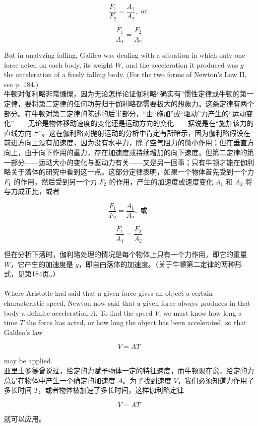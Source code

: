 \documentclass{article}
\begin{document}
\[
\frac{F_1}{F_2} = \frac{A_1}{A_2}, \text{ or }
\]

\[
\frac{F_1}{A_1} = \frac{F_2}{A_2}
\]

\noindent But in analyzing falling, Galileo was dealing with a situation in which only one force acted on each body, its weight \( W \), and the acceleration it produced was \( g \) the acceleration of a freely falling body. (For the two forms of Newton's Law II, see p. 184.)\\
牛顿对伽利略非常慷慨，因为无论怎样论证伽利略“确实有”惯性定律或牛顿的第一定律，要将第二定律的任何功劳归于伽利略都需要极大的想象力。这条定律有两个部分。在牛顿对第二定律的陈述的后半部分，“由“施加”或“驱动”力产生的“运动变化”——无论是物体移动速度的变化还是运动方向的变化——据说是在“施加该力的直线方向上”。这在伽利略对抛射运动的分析中肯定有所暗示，因为伽利略假设在前进方向上没有加速度，因为没有水平力，除了空气阻力的微小作用；但在垂直方向上，由于向下作用的重力，存在加速度或持续增加的向下速度。但第二定律的第一部分——运动大小的变化与驱动力有关——又是另一回事；只有牛顿才能在伽利略关于落体的研究中看到这一点。这部分定律表明，如果一个物体首先受到一个力 \( F_1 \) 的作用，然后受到另一个力 \( F_2 \) 的作用，产生的加速度或速度变化 \( A_1 \) 和 \( A_2 \) 将与力成正比，或者

\[
\frac{F_1}{F_2} = \frac{A_1}{A_2}, \text{ 或 }
\]

\[
\frac{F_1}{A_1} = \frac{F_2}{A_2}
\]

\noindent 但在分析下落时，伽利略处理的情况是每个物体上只有一个力作用，即它的重量 \( W \)，它产生的加速度是 \( g \)，即自由落体的加速度。（关于牛顿第二定律的两种形式，见第184页。）\\

\\
Where Aristotle had said that a given force gives an object a certain characteristic speed, Newton now said that a given force always produces in that body a definite acceleration \( A \). To find the speed \( V \), we must know how long a time \( T \) the force has acted, or how long the object has been accelerated, so that Galileo's law

\[
V = AT
\]

\noindent may be applied.\\
亚里士多德曾说过，给定的力赋予物体一定的特征速度，而牛顿现在说，给定的力总是在物体中产生一个确定的加速度 \( A \)。为了找到速度 \( V \)，我们必须知道力作用了多长时间 \( T \)，或者物体被加速了多长时间，这样伽利略定律

\[
V = AT
\]

\noindent 就可以应用。\\
\end{document}
